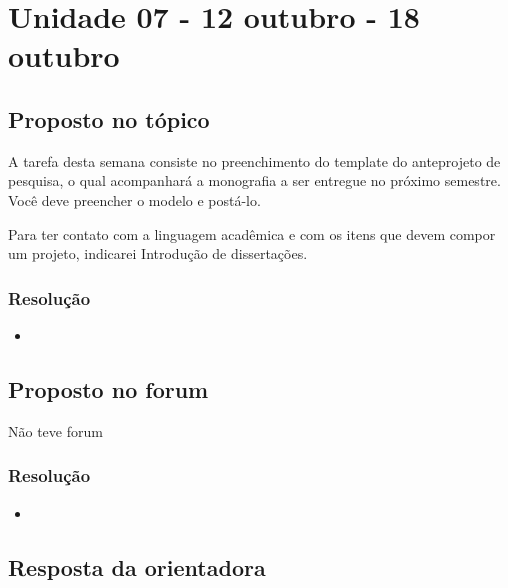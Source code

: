 

\chapter{Unidade 07 - 12 outubro - 18 outubro}

\section{Proposto no tópico}

A tarefa desta semana consiste no preenchimento do template  do anteprojeto de pesquisa, o qual acompanhará a monografia a ser entregue no próximo semestre. Você deve preencher o modelo e postá-lo.

Para ter contato com a linguagem acadêmica e com os itens que devem compor um projeto, indicarei Introdução de dissertações.

\subsection{Resolução}


\begin{itemize}
  \item 
\end{itemize}

\section{Proposto no forum}

Não teve forum


\subsection{Resolução}

\begin{itemize}
	\item 
\end{itemize}

\section{Resposta da orientadora}

